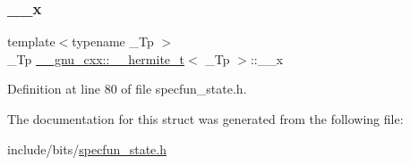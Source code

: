 \subsubsection{\texorpdfstring{\+\_\+\+\_\+x}{\_\_x}}
{\footnotesize\ttfamily template$<$typename \+\_\+\+Tp $>$ \\
\+\_\+\+Tp \hyperlink{struct____gnu__cxx_1_1____hermite__t}{\+\_\+\+\_\+gnu\+\_\+cxx\+::\+\_\+\+\_\+hermite\+\_\+t}$<$ \+\_\+\+Tp $>$\+::\+\_\+\+\_\+x}



Definition at line 80 of file specfun\+\_\+state.\+h.



The documentation for this struct was generated from the following file\+:\begin{DoxyCompactItemize}
\item 
include/bits/\hyperlink{specfun__state_8h}{specfun\+\_\+state.\+h}\end{DoxyCompactItemize}
